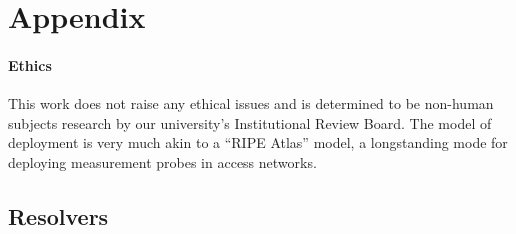 \appendix
\section{Appendix}

\paragraph{Ethics}
This work does not raise any ethical issues and 
is determined to be non-human subjects research by our university's
Institutional Review Board.  The model of deployment is very much akin to a
``RIPE Atlas'' model, a longstanding mode for deploying measurement probes in
access networks.

\subsection{Resolvers}\label{sec:resolvers}
